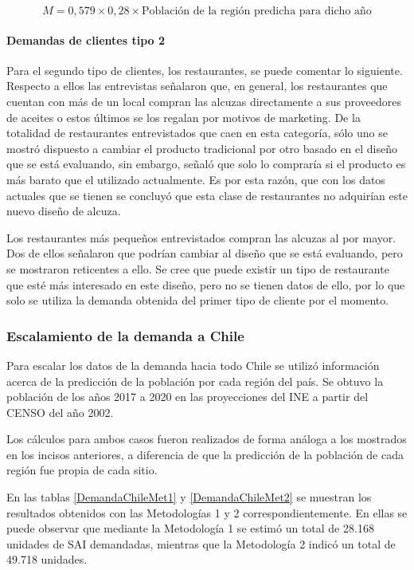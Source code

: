 \begin{equation*}
M=0,579\times 0,28 \times \mbox{Población de la región predicha para dicho año}
\end{equation*}

\paragraph{Demandas de clientes tipo 2}

Para el segundo tipo de clientes, los restaurantes, se puede comentar lo siguiente. Respecto a ellos las entrevistas señalaron que, en general, los restaurantes que cuentan con más de un local compran las alcuzas directamente a sus proveedores de aceites o estos últimos se los regalan por motivos de marketing. De la totalidad de restaurantes entrevistados que caen en esta categoría, sólo uno se mostró dispuesto a cambiar el producto tradicional por otro basado en el diseño que se está evaluando, sin embargo, señaló que solo lo compraría si el producto es más barato que el utilizado actualmente. Es por esta razón, que con los datos actuales que se tienen se concluyó que esta clase de restaurantes no adquirían este nuevo diseño de alcuza.

Los restaurantes más pequeños entrevistados compran las alcuzas al por mayor. Dos de ellos señalaron que podrían cambiar al diseño que se está evaluando, pero se mostraron reticentes a ello. Se cree que puede existir un tipo de restaurante que esté más interesado en este diseño, pero no se tienen datos de ello, por lo que solo se utiliza la demanda obtenida del primer tipo de cliente por el momento.

\subsubsection{Escalamiento de la demanda a Chile}

Para escalar los datos de la demanda hacia todo Chile se utilizó información acerca de la predicción de la población por cada región del país. Se obtuvo la población de los años 2017 a 2020 en las proyecciones del INE a partir del CENSO del año 2002.

Los cálculos para ambos casos fueron realizados de forma análoga a los mostrados en los incisos anteriores, a diferencia de que la predicción de la población de cada región fue propia de cada sitio.

En las tablas \ref{DemandaChileMet1} y \ref{DemandaChileMet2} se muestran los resultados obtenidos con las Metodologías 1 y 2 correspondientemente. En ellas se puede observar que mediante la Metodología 1 se estimó un total de 28.168 unidades de SAI demandadas, mientras que la Metodología 2 indicó un total de 49.718 unidades.

